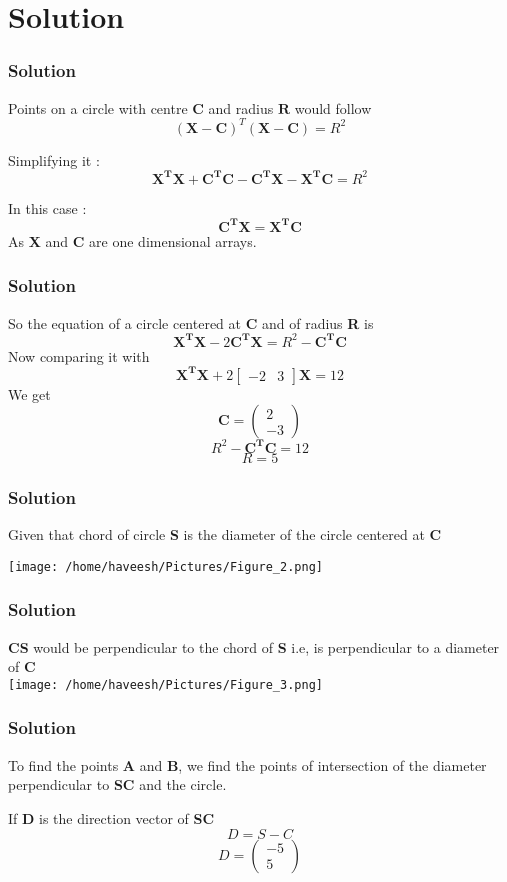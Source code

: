 \documentclass{beamer}
\begin{document}
\section{Solution}


\begin{frame}
\frametitle{Solution}
Points on a circle with centre $ \mathbf{C} $ and radius $\mathbf{R}$ would follow $$ (\mathbf{X} - \mathbf{C})^T(\mathbf{X} - \mathbf{C}) = R^2 $$

Simplifying it :
$$ \mathbf{X^TX} + \mathbf{C^TC} - \mathbf{C^TX} - \mathbf{X^TC} = R^2 $$

In this case :
$$ \mathbf{C^TX} = \mathbf{X^TC} $$ 
As \textbf{X} and \textbf{C} are one dimensional arrays.
\end{frame}

\begin{frame}
\frametitle{Solution}
So the equation of a circle centered at \textbf{C} and of radius \textbf{R} is
$$ \mathbf{X^TX} - 2\mathbf{C^TX} = R^2 - \mathbf{C^TC} $$
Now comparing it with 
$$ \mathbf{X^TX} + 2\left[
\begin{matrix}
-2 & 3 
\end{matrix}
\right]\mathbf{X} = 12 $$
We get
$$ \mathbf{C} = \left(\begin{matrix}
2 \\
-3
\end{matrix} \right)
$$
$$ R^2 - \mathbf{C^TC} = 12 $$
$$ R = 5 $$ 

\end{frame}

\begin{frame}
\frametitle{Solution} 

Given that chord of circle \textbf{S} is the diameter of the circle centered at \textbf{C}

\texttt{[image: /home/haveesh/Pictures/Figure\_2.png]}
\end{frame}

\begin{frame}
\frametitle{Solution}
\textbf{CS} would be perpendicular to the chord of \textbf{S} i.e, is perpendicular to a diameter of \textbf{C} \\
\texttt{[image: /home/haveesh/Pictures/Figure\_3.png]}
\end{frame}

\begin{frame}
\frametitle{Solution}
To find the points \textbf{A} and \textbf{B}, we find the points of intersection of the diameter perpendicular to \textbf{SC} and the circle. 

If \textbf{D} is the direction vector of \textbf{SC}
$$ D = S - C$$
$$ D = \left( \begin{matrix}
-5 \\
5
\end{matrix} \right) $$
\end{frame}
\end{document}
